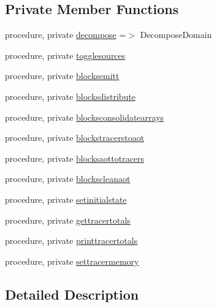 \subsection*{Private Member Functions}
\begin{DoxyCompactItemize}
\item 
procedure, private \mbox{\hyperlink{structsimulation__mod_1_1simulation__class_a559d8d450db2c6b568cb6e0e4dbab350}{decompose}} =$>$ Decompose\+Domain
\item 
procedure, private \mbox{\hyperlink{structsimulation__mod_1_1simulation__class_a2394700a952ccf667b61d53764c73a54}{togglesources}}
\item 
procedure, private \mbox{\hyperlink{structsimulation__mod_1_1simulation__class_a6e740eee52324299ca5f6acd98d0c657}{blocksemitt}}
\item 
procedure, private \mbox{\hyperlink{structsimulation__mod_1_1simulation__class_a06672383d5978e81af6836eb6ebfd46a}{blocksdistribute}}
\item 
procedure, private \mbox{\hyperlink{structsimulation__mod_1_1simulation__class_a8280bb9b6d664b82c58d0a41c7ffc3cd}{blocksconsolidatearrays}}
\item 
procedure, private \mbox{\hyperlink{structsimulation__mod_1_1simulation__class_a86fd4b37e89c2ecbcdef93b156d83fc4}{blockstracerstoaot}}
\item 
procedure, private \mbox{\hyperlink{structsimulation__mod_1_1simulation__class_a76130621d9de5c88e1af063a21b4afa6}{blocksaottotracers}}
\item 
procedure, private \mbox{\hyperlink{structsimulation__mod_1_1simulation__class_a1b9db63a26711c01fc0e994c39a7ae1a}{blockscleanaot}}
\item 
procedure, private \mbox{\hyperlink{structsimulation__mod_1_1simulation__class_aeb84b150c76e399c3dc33fbc3f7874ae}{setinitialstate}}
\item 
procedure, private \mbox{\hyperlink{structsimulation__mod_1_1simulation__class_ab22e46320d4a3dd0f2739894d1165a85}{gettracertotals}}
\item 
procedure, private \mbox{\hyperlink{structsimulation__mod_1_1simulation__class_a8ddba2b86c2137f5dfc7fcd301badd66}{printtracertotals}}
\item 
procedure, private \mbox{\hyperlink{structsimulation__mod_1_1simulation__class_a7cabf864e327d6e35f6cb7bd85b1db6a}{settracermemory}}
\end{DoxyCompactItemize}


\subsection{Detailed Description}


